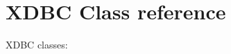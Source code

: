 
\newcommand{\Class}[1]{
  \section{Class \CurClass}
  \ifonline
    \public{\CurClass}
  \fi
  \label{class:\CurClass}
  \index{\CurClass}
  \index{Classes!\CurClass}
}

\newcommand{\Method}[1]{
  \subsubsection{#1}
  \ifonline
    \public{\CurClass.#1}
  \fi
  \label{class:\CurClass:#1}
  \index{\CurClass!#1}
}

\newcommand{\Variable}[1]{
  \subsubsection{#1}
  \label{class:\CurClass:#1}
  \index{\CurClass!#1}
  {\tt #1}
}

\newcommand{\ClassRef}[1]{\ref[#1]{class:#1}}
\newcommand{\MethodRef}[2]{\ref[#2]{class:#1:#2}}
\newcommand{\MyMethodRef}[1]{\ref[#1]{class:\CurClass:#1}}

\newcommand{\Var}[1]{\item[{\bf #1}]}

\newcommand{\MIitem}[2]{\item[{\bf \ref{class:\CurClass:#1}}#2]}
\newcommand{\VIitem}[1]{\item[{\bf \ref{class:\CurClass:#1}}]}

\chapter{XDBC Class reference}

XDBC classes:

\begin{description}
\item[{\ClassRef{Connection}}] 
\item[{\ClassRef{DatabaseMetaData}}] 
\item[{\ClassRef{PreparedStatement}}] 
\item[{\ClassRef{ResultSet}}]        
\item[{\ClassRef{ResultSetMetaData}}] 
\item[{\ClassRef{Statement}}] 
\item[{\ClassRef{Date}}] 
\item[{\ClassRef{Time}}] 
\item[{\ClassRef{Timestamp}}] 
\end{description}

